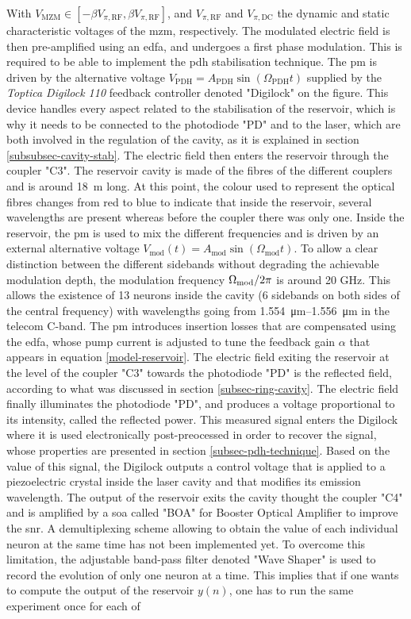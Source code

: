 With $V_{\text{MZM}} \in [-\beta V_{\pi,\text{RF}},\beta V_{\pi,\text{RF}}]$, and $V_{\pi,\text{RF}}$ and $V_{\pi,\text{DC}}$ the dynamic and static characteristic voltages of the \gls{mzm}, respectively. The modulated electric field is then pre-amplified using an \gls{edfa}, and undergoes a first phase modulation. This is required to be able to implement the \gls{pdh} stabilisation technique. The \gls{pm} is driven by the alternative voltage $V_{\text{PDH}} = A_{\text{PDH}} \sin{(\Omega_{\text{PDH}}t)}$ supplied by the \textit{Toptica Digilock 110} feedback controller denoted "Digilock" on the figure. This device handles every aspect related to the stabilisation of the reservoir, which is why it needs to be connected to the photodiode "PD" and to the laser, which are both involved in the regulation of the cavity, as it is explained in section \ref{subsubsec-cavity-stab}. The electric field then enters the reservoir through the coupler "C3". The reservoir cavity is made of the fibres of the different couplers and is around \SI{18}{m} long. At this point, the colour used to represent the optical fibres changes from red to blue to indicate that inside the reservoir, several wavelengths are present whereas before the coupler there was only one. Inside the reservoir, the \gls{pm} is used to mix the different frequencies and is driven by an external alternative voltage $V_{\text{mod}}(t) = A_{\text{mod}} \sin{ (\Omega_{\text{mod}} t)}$. To allow a clear distinction between the different sidebands without degrading the achievable modulation depth, the modulation frequency $\Omega_{\text{mod}}/2\pi$ is around 20 GHz. This allows the existence of 13 neurons inside the cavity (6 sidebands on both sides of the central frequency) with wavelengths going from \SIrange{1.554}{1.556}{\micro\metre} in the telecom C-band. The \gls{pm} introduces insertion losses that are compensated using the \gls{edfa}, whose pump current is adjusted to tune the feedback gain $\alpha$ that appears in equation \eqref{model-reservoir}. The electric field exiting the reservoir at the level of the coupler "C3" towards the photodiode "PD" is the reflected field, according to what was discussed in section \ref{subsec-ring-cavity}. The electric field finally illuminates the photodiode "PD", and produces a voltage proportional to its intensity, called the reflected power. This measured signal enters the Digilock where it is used electronically post-preocessed in order to recover the \pdh signal, whose properties are presented in section \ref{subsec-pdh-technique}. Based on the value of this signal, the Digilock outputs a control voltage that is applied to a piezoelectric crystal inside the laser cavity and that modifies its emission wavelength. The output of the reservoir exits the cavity thought the coupler "C4" and is amplified by a \gls{soa} called "BOA" for Booster Optical Amplifier to improve the \gls{snr}. A demultiplexing scheme allowing to obtain the value of each individual neuron at the same time has not been implemented yet. To overcome this limitation, the adjustable band-pass filter denoted "Wave Shaper" is used to record the evolution of only one neuron at a time. This implies that if one wants to compute the output of the reservoir $y(n)$, one has to run the same experiment once for each of 